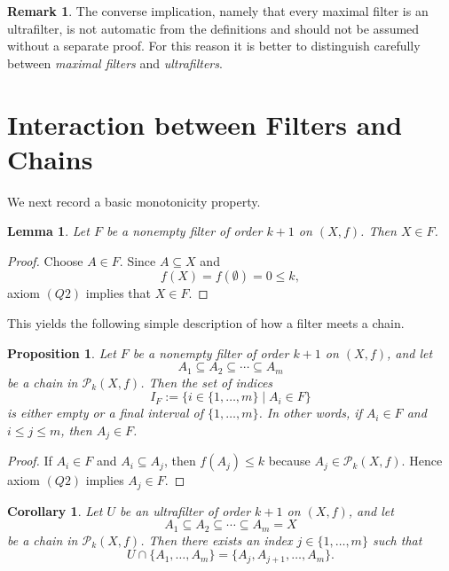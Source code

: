 \documentclass[10pt]{book}
\newtheorem{lemma}[theorem]{Lemma}
\newtheorem{corollary}[theorem]{Corollary}
\newtheorem{proposition}[theorem]{Proposition}
\theoremstyle{definition}
\newtheorem{remark}[theorem]{Remark}
\begin{document}
\begin{remark}
The converse implication, namely that every maximal filter is an ultrafilter, is not automatic from the definitions and should not be assumed without a separate proof.
For this reason it is better to distinguish carefully between \emph{maximal filters} and \emph{ultrafilters}.
\end{remark}

\section{Interaction between Filters and Chains}

We next record a basic monotonicity property.

\begin{lemma}
\label{lem:X-in-filter}
Let \(F\) be a nonempty filter of order \(k+1\) on \((X,f)\).
Then \(X\in F\).
\end{lemma}

\begin{proof}
Choose \(A\in F\).
Since \(A\subseteq X\) and
\[
f(X)=f(\emptyset)=0\leq k,
\]
axiom \((Q2)\) implies that \(X\in F\).
\end{proof}

This yields the following simple description of how a filter meets a chain.

\begin{proposition}
\label{prop:filter-meets-chain}
Let \(F\) be a nonempty filter of order \(k+1\) on \((X,f)\), and let
\[
A_1 \subseteq A_2 \subseteq \cdots \subseteq A_m
\]
be a chain in \(\mathcal{P}_k(X,f)\).
Then the set of indices
\[
I_F:=\{i\in \{1,\dots,m\}\mid A_i\in F\}
\]
is either empty or a final interval of \(\{1,\dots,m\}\).
In other words, if \(A_i\in F\) and \(i\leq j\leq m\), then \(A_j\in F\).
\end{proposition}

\begin{proof}
If \(A_i\in F\) and \(A_i\subseteq A_j\), then \(f(A_j)\leq k\) because \(A_j\in\mathcal{P}_k(X,f)\).
Hence axiom \((Q2)\) implies \(A_j\in F\).
\end{proof}

\begin{corollary}
\label{cor:ultrafilter-chain-final-segment}
Let \(U\) be an ultrafilter of order \(k+1\) on \((X,f)\), and let
\[
A_1 \subseteq A_2 \subseteq \cdots \subseteq A_m = X
\]
be a chain in \(\mathcal{P}_k(X,f)\).
Then there exists an index \(j\in\{1,\dots,m\}\) such that
\[
U\cap \{A_1,\dots,A_m\}=\{A_j,A_{j+1},\dots,A_m\}.
\]
\end{corollary}
\end{document}
